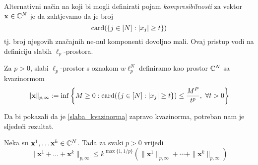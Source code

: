 \documentclass[a4paper,twoside,12pt]{memoir} %
\newcommand{\vect}[1]{\mathbf{#1}}
\renewcommand{\vec}{\vect}
\newcommand{\card}{\text{\normalfont{card}}}
\begin{document}
\indent Alternativni na\v{c}in na koji bi mogli definirati pojam \textit{kompresibilnosti} za vektor $\vec{x}\in\C^N$ je da zahtjevamo da je broj
$$\card(\{j\in[N]:|x_j|\geq t\})$$
tj. broj njegovih zna\v{c}ajnih ne-nul komponenti dovoljno mali. Ovaj pristup vodi na definiciju slabih $\ell_p$-prostora.
\begin{defn}
Za $p>0$, slabi $\ell_p$-prostor s oznakom $w\ell_p^N$ definiramo kao prostor $\mathbb{C}^N$ sa kvazinormom
\begin{equation}\label{slaba_kvazinorma}
    \|\vec{x}\|_{p, \infty}:=\inf\bigg\{ M \geq 0: \card (\{j\in [N]: |x_j|\geq t \})\leq \frac{M^P}{t^p},\ \forall t>0    \bigg\}
\end{equation}
\end{defn}
\noindent
Da bi pokazali da je \eqref{slaba_kvazinorma} zapravo kvazinorma, potreban nam je sljede\'ci rezultat.
\begin{prop}
    Neka su $\vec{x}^1,\dots\vec{x}^k\in\C^N$. Tada za svaki $p>0$ vrijedi 
    \begin{equation*}
    \|\vec{x}^1+\dots+\vec{x}^k\|_{p,\infty} \leq k^{\max\{1, 1/p\}}(\|\vec{x}^1\|_{p, \infty} + \cdots + \|\vec{x}^k\|_{p, \infty})
    \end{equation*}
\end{prop}
\end{document}

